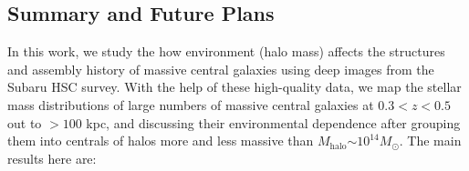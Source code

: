 \documentclass{emulateapj}
\def\redm{\texttt{redMaPPer}}
\def\nbcg{\texttt{cenLowMh}}
\def\mstar{{$M_{\star}$}}
\def\mhalo{{$M_{\mathrm{halo}}$}}
\newcommand{\addref}{{\textcolor{red}{REF}}}
\newcommand{\update}[1]{\textcolor{Bittersweet}{#1}}
\begin{document}
\begin{CJK*}{UTF8}{gbsn}
   
%
%    
%    


\section{Summary and Future Plans}
    \label{sec:summary}

    \update{ 
    In this work, we study the how environment (halo mass) affects the structures and
    assembly history of massive central galaxies using deep images from the Subaru HSC 
    survey.
    With the help of these high-quality data, we map the stellar mass distributions of 
    large numbers of massive central galaxies at $0.3 < z < 0.5$ out to $>100$ kpc, 
    and discussing their environmental dependence after grouping them into centrals of 
    halos more and less massive than \mhalo{}$\sim 10^{14} M_{\odot}$. 
    The main results here are:}
    

\end{CJK*}
\end{document}
